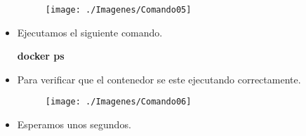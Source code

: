 \begin{itemize}
\begin{figure}[htb]
\begin{center}
							\texttt{[image: ./Imagenes/Comando05]}
						\end{center}
					\end{figure}
				\item Ejecutamos el siguiente comando.
					\begin{center}
						\textbf{docker ps} \\
					\end{center}
				\item Para verificar que el contenedor se este ejecutando correctamente.
					\begin{figure}[htb]
						\begin{center}
							\texttt{[image: ./Imagenes/Comando06]}
						\end{center}
					\end{figure}
					\vspace{6cm}
				\item Esperamos unos segundos.

\end{itemize}
